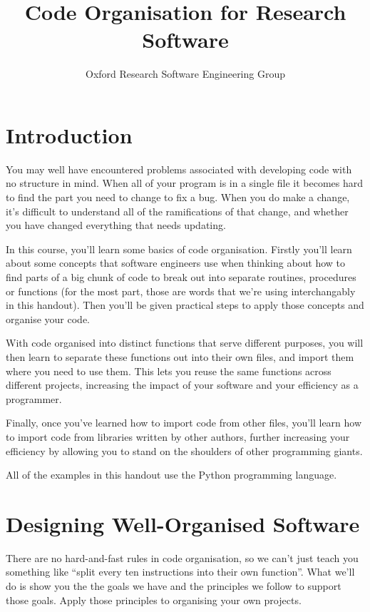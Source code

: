 \documentclass[a4paper]{article}
\begin{document}
\title{Code Organisation for Research Software}
\author{Oxford Research Software Engineering Group}
\maketitle

\section{Introduction}
You may well have encountered problems associated with developing code with no structure in mind.
When all of your program is in a single file it becomes hard to find the part you need to change to fix a bug.
When you do make a change, it's difficult to understand all of the ramifications of that change, and whether you have changed everything that needs updating.

In this course, you'll learn some basics of code organisation.
Firstly you'll learn about some concepts that software engineers use when thinking about how to find parts of a big chunk of code to break out into separate routines, procedures or functions (for the most part, those are words that we're using interchangably in this handout).
Then you'll be given practical steps to apply those concepts and organise your code.

With code organised into distinct functions that serve different purposes, you will then learn to separate these functions out into their own files, and import them where you need to use them.
This lets you reuse the same functions across different projects, increasing the impact of your software and your efficiency as a programmer.

Finally, once you've learned how to import code from other files, you'll learn how to import code from libraries written by other authors, further increasing your efficiency by allowing you to stand on the shoulders of other programming giants.

All of the examples in this handout use the Python programming language.

\section{Designing Well-Organised Software}

There are no hard-and-fast rules in code organisation, so we can't just teach you something like ``split every ten instructions into their own function''.
What we'll do is show you the the goals we have and the principles we follow to support those goals.
Apply those principles to organising your own projects.
\end{document}
